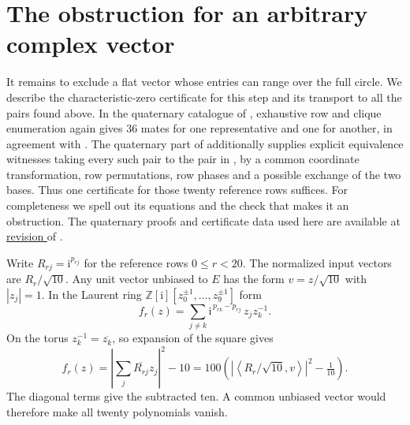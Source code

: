 \documentclass[11pt]{article}
\newcommand{\Z}{\mathbb Z}
\newcommand{\ii}{\mathrm i}
\newcommand{\code}[1]{\texttt{\detokenize{#1}}}
\begin{document}
\section{The obstruction for an arbitrary complex vector}

It remains to exclude a flat vector whose entries can range over the full
circle. We describe the characteristic-zero certificate for this step
and its transport to all the pairs found above. In the quaternary
catalogue of \cite{quaternary}, exhaustive row and clique enumeration
again gives 36 mates for one representative and one for another,
in agreement with \cite[Table~4]{regular}. The quaternary part of
\cite{software} additionally supplies explicit equivalence witnesses
taking every such pair to the pair in \cite[Table~1]{best}, by a common
coordinate transformation, row permutations, row phases and a possible
exchange of the two bases. Thus one certificate for those
twenty reference rows suffices. For completeness we spell out its
equations and the check that makes it an obstruction.
The quaternary proofs and certificate data used here are available at
\href{https://github.com/sansssssss1/mub10-lean/tree/4321a0e7c888149fbeadd5ab8356555a68baa64e}{revision \code{4321a0e}} of \cite{software}.

Write \(R_{rj}=\ii^{p_{rj}}\) for the reference rows
\(0\le r<20\). The normalized input vectors are \(R_r/\sqrt{10}\).
Any unit vector unbiased to \(E\) has the form \(v=z/\sqrt{10}\) with
\(|z_j|=1\). In the Laurent ring
\(\Z[\ii][z_0^{\pm1},\ldots,z_9^{\pm1}]\) form
\[
 f_r(z)=\sum_{j\ne k}\ii^{\,p_{rk}-p_{rj}}\,z_jz_k^{-1}.
\]
On the torus \(z_k^{-1}=\overline{z_k}\), so expansion of the square
gives
\begin{equation}\label{eq:laurent}
       f_r(z)=\left|\sum_j\overline{R_{rj}}z_j\right|^2-10
              =100\left(\left|\left\langle
                  R_r/\sqrt{10},v\right\rangle\right|^2-\tfrac1{10}\right).
\end{equation}
The diagonal terms give the subtracted ten. A common unbiased vector
would therefore make all twenty polynomials vanish.
\end{document}
